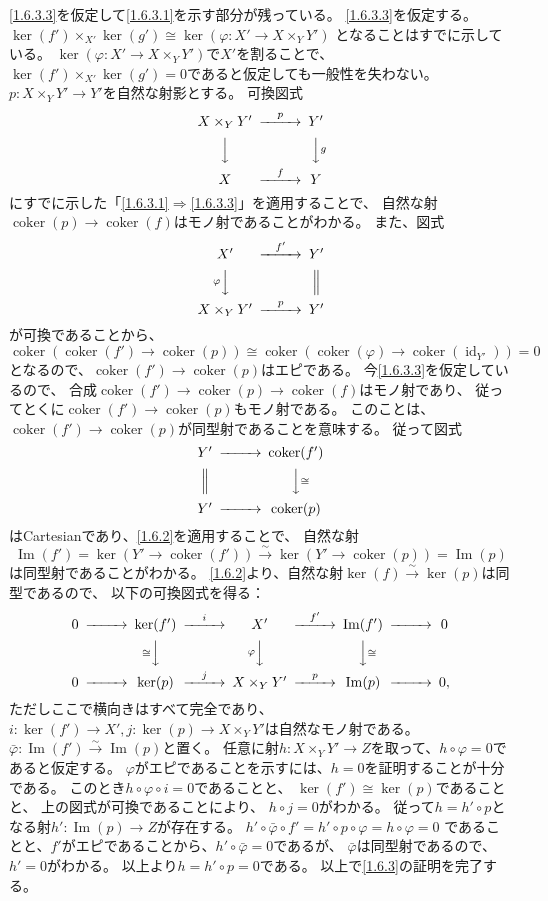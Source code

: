 \documentclass[uplatex,dvipdfmx]{jsarticle}
\makeatletter
\theoremstyle{definition}
\renewenvironment{proof}[1][\proofname]{
  \pushQED{\qed}%
  \normalfont \topsep6\p@\@plus6\p@\relax
  \trivlist
  \item[\hskip\labelsep
    #1\@addpunct{\textbf{.}}]\ignorespaces
}{%
  \popQED\endtrivlist\@endpefalse
}
\providecommand{\proofname}{証明}
\DeclareMathOperator{\id}{\mathrm{id}}
\DeclareMathOperator{\im}{\mathrm{Im}}
\DeclareMathOperator{\coker}{\mathrm{coker}}
\makeatother
\begin{document}
\begin{proof}
  \ref{1.6.3.3}を仮定して\ref{1.6.3.1}を示す部分が残っている。
  \ref{1.6.3.3}を仮定する。
  \(\ker(f')\times_{X'}\ker(g')\cong \ker(\varphi:X'\to X\times_YY')\)
  となることはすでに示している。
  \(\ker(\varphi:X'\to X\times_YY')\)で\(X'\)を割ることで、
  \(\ker(f')\times_{X'}\ker(g') = 0\)であると仮定しても一般性を失わない。
  \(p:X\times_YY'\to Y'\)を自然な射影とする。
  可換図式
  \[
  \begin{CD}
    X\times_YY' @> p >> Y' \\
    @VVV @VV g V \\
    X @> f >> Y
  \end{CD}
  \]
  にすでに示した「\ref{1.6.3.1}\(\Rightarrow\)\ref{1.6.3.3}」を適用することで、
  自然な射\(\coker(p)\to \coker(f)\)はモノ射であることがわかる。
  また、図式
  \[
  \begin{CD}
    X' @> f' >> Y' \\
    @V \varphi VV   @| \\
    X\times_YY' @> p >> Y'
  \end{CD}
  \]
  が可換であることから、
  \[\coker(\coker(f') \to \coker(p)) \cong
  \coker(\coker(\varphi) \to \coker(\id_{Y'})) = 0\]
  となるので、\(\coker(f')\to \coker(p)\)はエピである。
  今\ref{1.6.3.3}を仮定しているので、
  合成\(\coker(f')\to \coker(p) \to \coker(f)\)はモノ射であり、
  従ってとくに\(\coker(f')\to \coker(p)\)もモノ射である。
  このことは、\(\coker(f')\to \coker(p)\)が同型射であることを意味する。
  従って図式
  \[
  \begin{CD}
    Y' @>>> \coker(f') \\
    @| @VV \cong V \\
    Y' @>>> \coker(p)
  \end{CD}
  \]
  はCartesianであり、\ref{1.6.2}を適用することで、
  自然な射
  \[\im(f') = \ker(Y'\to \coker(f')) \xrightarrow{\sim} \ker(Y'\to\coker(p)) = \im(p)\]
  は同型射であることがわかる。
  \ref{1.6.2}より、自然な射\(\ker(f)\xrightarrow{\sim} \ker(p)\)は同型であるので、
  以下の可換図式を得る：
  \[
  \begin{CD}
    0 @>>> \ker(f') @> i >> X' @> f' >> \im(f') @>>> 0  \\
    @.   @V \cong VV   @V \varphi VV   @VV \cong V    @. \\
    0 @>>> \ker(p) @> j >> X\times_YY' @> p >> \im(p) @>>> 0,
  \end{CD}
  \]
  ただしここで横向きはすべて完全であり、
  \(i:\ker(f')\to X', j:\ker(p)\to X\times_YY'\)は自然なモノ射である。
  \(\bar{\varphi}:\im(f')\xrightarrow{\sim} \im(p)\)と置く。
  任意に射\(h:X\times_YY' \to Z\)を取って、\(h\circ\varphi = 0\)であると仮定する。
  \(\varphi\)がエピであることを示すには、\(h=0\)を証明することが十分である。
  このとき\(h\circ\varphi \circ i = 0\)であることと、
  \(\ker(f')\cong \ker(p)\)であることと、
  上の図式が可換であることにより、
  \(h\circ j = 0\)がわかる。
  従って\(h = h'\circ p\)となる射\(h':\im(p)\to Z\)が存在する。
  \(h'\circ \bar{\varphi}\circ f' = h'\circ p\circ \varphi = h\circ \varphi = 0\)
  であることと、\(f'\)がエピであることから、\(h'\circ \bar{\varphi} = 0\)であるが、
  \(\bar{\varphi}\)は同型射であるので、\(h'=0\)がわかる。
  以上より\(h = h'\circ p = 0\)である。
  以上で\ref{1.6.3}の証明を完了する。


\end{proof}
\end{document}
